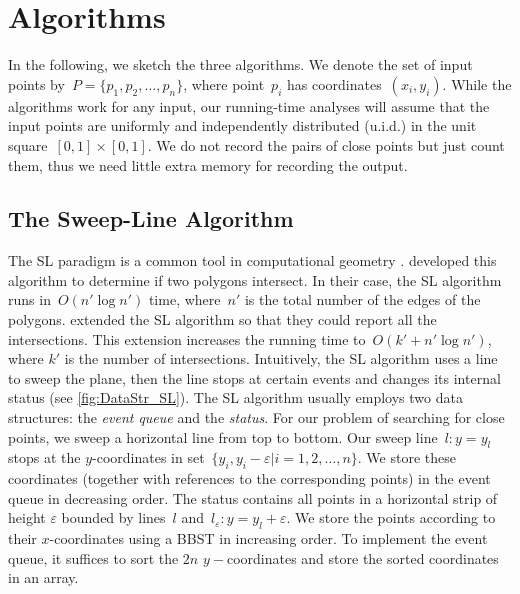 \section{Algorithms}
\label{sec:DataStr_Algorithms}

In the following, we sketch the three algorithms. 
We denote the set of input points 
by~$P=\{p_{1},p_{2},\ldots , p_{n}\}$,
where point~$p_{i}$ has coordinates~$(x_{i},y_{i})$. 
While the algorithms work for any input, 
our running-time analyses will assume 
that the input points are 
uniformly and independently distributed (u.i.d.) 
in the unit square~$[0,1]\times [0,1]$. 
We do not record the pairs of close points 
but just count them, 
thus we need little extra memory for recording the output.



\subsection{The Sweep-Line Algorithm}
\label{sec:DataStr_SLAlgorithm}



The SL paradigm is a common tool in computational geometry
\parencite[]{deBerg2008}.
\textcite{Shamos1976} developed this algorithm to determine
if two polygons intersect.
In their case, the SL algorithm runs in~$O(n'\log n')$ time,
where~$n'$ is the total number of the edges of the polygons.
\textcite{Bentley1979} extended the SL algorithm so that 
they could report all the intersections.
This extension increases the running time 
to~$O(k' +n'\log n')$,
where $k'$ is the number of intersections. 
Intuitively, the SL algorithm uses a line to sweep the plane, 
then the line stops at certain events 
and changes its internal status
(see \fig\ref{fig:DataStr_SL}).
The SL algorithm usually employs two data structures: 
the \emph{event queue} and the \emph{status}. 
For our problem of searching for close points, 
we sweep a horizontal line from top to bottom. 
Our sweep line~$l: y=y_{l}$ stops at the $y$-coordinates 
in set~$\{ y_{i}, y_{i}-\varepsilon | i=1, 2, \ldots , n\}$.
We store these coordinates
(together with references to the corresponding points) 
in the event queue in decreasing order. 
The status contains all points in a 
horizontal strip of height $ \varepsilon$ 
bounded by lines~$l$ 
and~$l_{\varepsilon}: y=y_{l}+\varepsilon$. 
We store the points according to 
their $x$-coordinates using a BBST in increasing order. 
To implement the event queue, 
it suffices to sort the $2n$ $y-$coordinates 
and store the sorted coordinates in an array.

